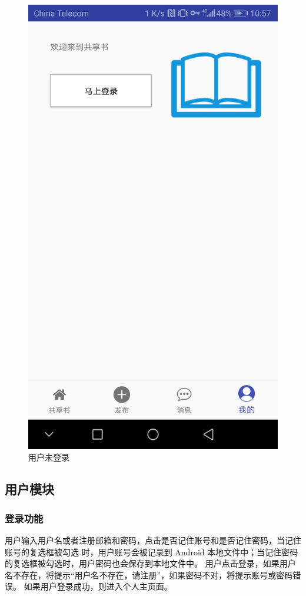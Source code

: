 \begin{figure}[h]
	\centering
	\includegraphics[scale=0.09]{Chapters/UI/unlogin.jpg}
	\caption{用户未登录}
	\label{unlogin}
\end{figure}

\subsection{用户模块}
\subsubsection{登录功能}
用户输入用户名或者注册邮箱和密码，点击是否记住账号和是否记住密码，当记住账号的复选框被勾选
时，用户账号会被记录到 Android 本地文件中；当记住密码的复选框被勾选时，用户密码也会保存到本地文件中。
用户点击登录，如果用户名不存在，将提示“用户名不存在，请注册”，如果密码不对，将提示账号或密码错误。
如果用户登录成功，则进入个人主页面。

